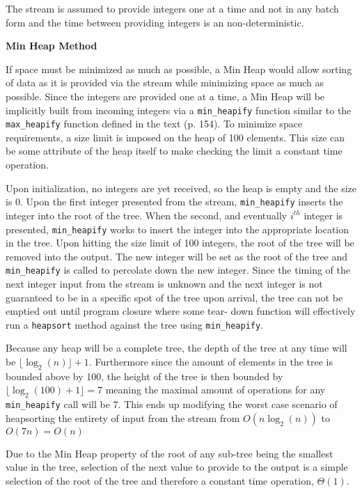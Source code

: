 \documentclass{article}
\newcommand\floor[1]{\lfloor#1\rfloor}  %
\begin{document}
The stream is assumed to provide integers one at a time and not in any batch form
and the time between providing integers is an non-deterministic. 

\textbf{Min Heap Method}

If space must be minimized as much as possible, a Min Heap would allow sorting
of data as it is provided via the stream while minimizing space as much as 
possible. Since the integers are provided one at a time, a Min Heap will be 
implicitly built from incoming integers via a \texttt{min\_heapify} function
similar to the
\texttt{max\_heapify} function defined in the text (p. 154). To minimize space 
requirements, a size limit is imposed on the heap of 100 elements. This size can
be some attribute of the heap itself to make checking the limit a constant time
operation. 

Upon initialization, no integers are yet received, so the heap is empty and the 
size is 0. Upon the first integer presented from the stream, \texttt{min\_heapify} inserts
the integer into the root of the tree. When the second, and eventually $i^{th}$
integer is presented, \texttt{min\_heapify} works to insert the integer into the 
appropriate location in the tree. Upon hitting the size limit of 100 integers, 
the root of the tree will be removed into the output. The new integer will be set
as the root of the tree and \texttt{min\_heapify} is called to percolate down the new 
integer. Since the timing of the next integer input from the stream is unknown 
and the next integer is not guaranteed to be in a specific spot of the tree upon
arrival, the tree can not be emptied out until program closure where some tear-
down function will effectively run a \texttt{heapsort} method against the tree using \texttt{min\_heapify}. 

Because any heap will be a complete tree, the depth of the tree at any time will
be $\floor{\log_{2}(n)} + 1$. Furthermore since the amount of elements in the 
tree is bounded above by 100, the height of the tree is then bounded by 
$\floor{\log_{2}(100) + 1} = 7$ meaning the maximal amount of operations for any
\texttt{min\_heapify} call will be 7. This ends up modifying the worst case scenario of 
heapsorting the entirety of input from the stream from $O(n \log_{2}(n))$ to 
$O(7n) = O(n)$

Due to the Min Heap property of the root of any sub-tree being the smallest value
in the tree, selection of the next value to provide to the output is a simple 
selection of the root of the tree and therefore a constant time operation, 
$\Theta(1)$. 
\end{document}
